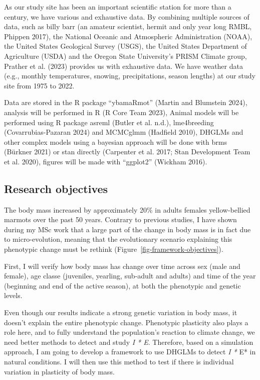 \documentclass[
  12pt,
  letterpaper,
]{scrartcl}
\begin{document}
As our study site has been an important scientific station for more than
a century, we have various and exhaustive data. By combining multiple
sources of data, such as billy barr (an amateur scientist, hermit and
only year long RMBL, Phippen 2017), the National Oceanic and Atmospheric
Administration (NOAA), the United States Geological Survey (USGS), the
United States Department of Agriculture (USDA) and the Oregon State
University's PRISM Climate group, Prather et al. (2023) provides us with
exhaustive data. We have weather data (e.g., monthly temperatures,
snowing, precipitations, season lengths) at our study site from 1975 to
2022.

Data are stored in the R package ``ybamaRmot'' (Martin and Blumstein
2024), analysis will be performed in R (R Core Team 2023), Animal models
will be performed using R package asreml (Butler et al. n.d.),
lme4breeding (Covarrubias-Pazaran 2024) and MCMCglmm (Hadfield 2010),
DHGLMs and other complex models using a bayesian approach will be done
with brms (Bürkner 2021) or stan directly (Carpenter et al. 2017; Stan
Development Team et al. 2020), figures will be made with ``ggplot2''
(Wickham 2016).

\newpage{}

\subsection{Research objectives}\label{research-objectives}

The body mass increased by approximately 20\% in adults females
yellow-bellied marmots over the past 50 years. Contrary to previous
studies, I have shown during my MSc work that a large part of the change
in body mass is in fact due to micro-evolution, meaning that the
evolutionary scenario explaining this phenotypic change must be rethink
(Figure~\ref{fig-framework-objectives}).

First, I will verify how body mass has change over time across sex (male
and female), age classe (juveniles, yearling, sub-adult and adults) and
time of the year (beginning and end of the active season), at both the
phenotypic and genetic levels.

Even though our results indicate a strong genetic variation in body
mass, it doesn't explain the entire phenotypic change. Phenotypic
plasticity also plays a role here, and to fully understand the
population's reaction to climate change, we need better methods to
detect and study \emph{I * E}. Therefore, based on a simulation
approach, I am going to develop a framework to use DHGLMs to detect
\emph{I * }E* in natural conditions. I will then use this method to test
if there is individual variation in plasticity of body mass.
\end{document}
